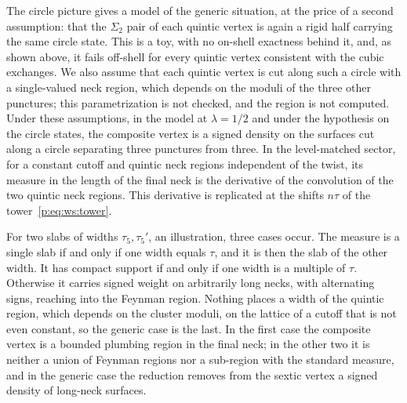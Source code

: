 The circle picture gives a model of the generic situation, at the price of a second assumption: that the $\Sigma_2$ pair of each quintic vertex is again a rigid half carrying the same circle state.
This is a toy, with no on-shell exactness behind it, and, as shown above, it fails off-shell for every quintic vertex consistent with the cubic exchanges.
We also assume that each quintic vertex is cut along such a circle with a single-valued neck region, which depends on the moduli of the three other punctures; this parametrization is not checked, and the region is not computed.
Under these assumptions, in the model at $\lambda = 1 / 2$ and under the hypothesis on the circle states, the composite vertex is a signed density on the surfaces cut along a circle separating three punctures from three.
In the level-matched sector, for a constant cutoff and quintic neck regions independent of the twist, its measure in the length of the final neck is the derivative of the convolution of the two quintic neck regions.
This derivative is replicated at the shifts $n \tau$ of the tower~\eqref{p:eq:ws:tower}.

For two slabs of widths $\tau_5, \tau_5'$, an illustration, three cases occur.
The measure is a single slab if and only if one width equals $\tau$, and it is then the slab of the other width.
It has compact support if and only if one width is a multiple of $\tau$.
Otherwise it carries signed weight on arbitrarily long necks, with alternating signs, reaching into the Feynman region.
Nothing places a width of the quintic region, which depends on the cluster moduli, on the lattice of a cutoff that is not even constant, so the generic case is the last.
In the first case the composite vertex is a bounded plumbing region in the final neck; in the other two it is neither a union of Feynman regions nor a sub-region with the standard measure, and in the generic case the reduction removes from the sextic vertex a signed density of long-neck surfaces.

